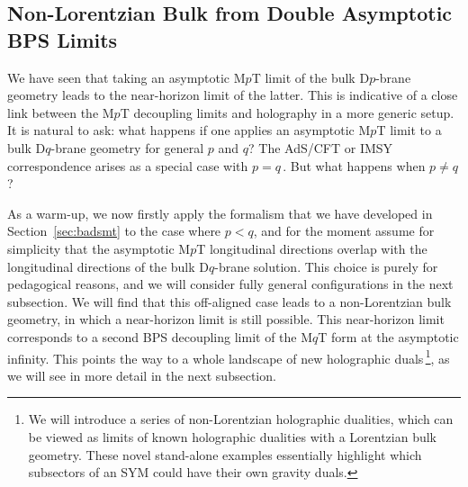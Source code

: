 \documentclass[11pt]{article}
\begin{document}
\subsection{Non-Lorentzian Bulk from Double Asymptotic BPS Limits} \label{sec:nlbdal}

We have seen that taking an asymptotic M$p$T limit of the bulk D$p$-brane geometry leads to the near-horizon limit of the latter. This is indicative of a close link between the M$p$T decoupling limits and holography in a more generic setup. It is natural to ask: what happens if one applies an asymptotic M$p$T limit to a bulk D$q$-brane geometry for general $p$ and $q$? The AdS/CFT or IMSY~\cite{Itzhaki:1998dd} correspondence arises as a special case with $p = q$\,. But what happens when $p \neq q$? 

As a warm-up, we now firstly apply the formalism that we have developed in Section~\ref{sec:badsmt} to the case where $p < q$,
and for the moment assume for simplicity that the asymptotic M$p$T longitudinal directions overlap with the longitudinal directions of the bulk D$q$-brane solution.
This choice is purely for pedagogical reasons, and we will consider fully general configurations in the next subsection. 
We will find that this off-aligned case leads to a non-Lorentzian bulk geometry, in which a near-horizon limit is still possible. This near-horizon limit corresponds to a second BPS decoupling limit of the M$q$T form at the asymptotic infinity. 
This points the way to a whole landscape of new holographic duals\,\footnote{We will introduce a series of non-Lorentzian holographic dualities, which can be viewed as limits of known holographic dualities with a Lorentzian bulk geometry. These novel stand-alone examples essentially highlight which subsectors of an SYM could have their own gravity duals.}, as we will see in more detail in the next subsection.

\vspace{3mm}
\end{document}
